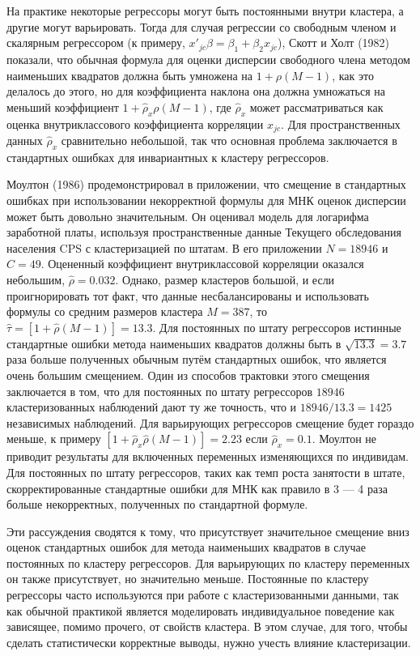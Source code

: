 На практике некоторые регрессоры могут быть постоянными внутри кластера, а другие могут варьировать. Тогда для случая регрессии со свободным членом и скалярным регрессором (к примеру, $x'_{jc}\beta = \beta_1 + \beta_2 x_{jc}$), Скотт и Холт (1982) показали, что обычная формула для оценки дисперсии свободного члена методом наименьших квадратов должна быть умножена на $1+\rho(M-1)$, как это делалось до этого, но для коэффициента наклона она должна умножаться на меньший коэффициент $1 + \hat \rho_x \rho (M-1)$, где $\hat \rho_x$ может рассматриваться как оценка внутриклассового коэффициента корреляции $x_{jc}$. Для пространственных данных $\hat \rho_x$ сравнительно небольшой, так что основная проблема заключается в стандартных ошибках для инвариантных к кластеру регрессоров. 

Моултон (1986) продемонстрировал в приложении, что смещение в стандартных ошибках при использовании некорректной формулы для МНК оценок дисперсии может быть довольно значительным. Он оценивал модель для логарифма заработной платы, используя пространственные данные Текущего обследования населения CPS с кластеризацией по штатам. В его приложении $N = 18 946$ и $C = 49$. Оцененный коэффициент внутриклассовой корреляции оказался небольшим, $\hat \rho =0.032$. Однако, размер кластеров большой, и если проигнорировать тот факт, что данные несбалансированы и использовать формулы со средним размеров кластера $M = 387$, то $\hat \tau = [1+ \hat \rho (M-1)] = 13.3$. Для постоянных по штату регрессоров истинные стандартные ошибки метода наименьших квадратов должны быть в $\sqrt{13.3} = 3.7$ раза больше полученных обычным путём стандартных ошибок, что является очень большим смещением. Один из способов трактовки этого смещения заключается в том, что для постоянных по штату регрессоров $18 946$ кластеризованных наблюдений дают ту же точность, что и $18946/13.3 = 1425$ независимых наблюдений. Для варьирующих регрессоров смещение будет гораздо меньше, к примеру $[1+ \hat \rho_x \hat \rho(M-1) ] = 2.23$ если $\hat \rho_x = 0.1$. Моултон не приводит результаты для включенных переменных изменяющихся по индивидам. Для постоянных по штату регрессоров, таких как темп роста занятости в штате, скорректированные стандартные ошибки для МНК как правило в 3 --- 4 раза больше некорректных, полученных по стандартной формуле. 

Эти рассуждения сводятся к тому, что присутствует значительное смещение вниз оценок стандартных ошибок для метода наименьших квадратов в случае постоянных по кластеру регрессоров. Для варьирующих по кластеру переменных он также присутствует, но значительно меньше. Постоянные по кластеру регрессоры часто используются при работе с кластеризованными данными, так как обычной практикой является моделировать индивидуальное поведение как зависящее, помимо прочего, от свойств кластера. В этом случае, для того, чтобы сделать статистически корректные выводы, нужно учесть влияние кластеризации. 


